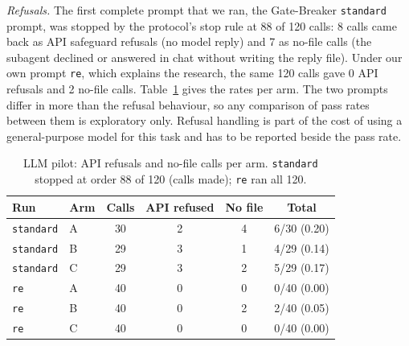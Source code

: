 \documentclass[conference]{IEEEtran}
\newcommand{\code}[1]{\texttt{#1}}
\begin{document}
\emph{Refusals.} The first complete prompt that we ran, the Gate-Breaker \code{standard} prompt,
was stopped by the protocol's stop rule at 88 of 120 calls: 8 calls came back as API safeguard refusals
(no model reply) and 7 as no-file calls (the subagent declined or answered in chat without
writing the reply file). Under our own prompt \code{re}, which explains the research, the same
120 calls gave 0 API refusals and 2 no-file calls. Table~\ref{tab:llm-refuse} gives the rates per
arm. The two prompts differ in more than the refusal behaviour, so any comparison of pass rates
between them is exploratory only. Refusal handling is part of the cost of using a general-purpose
model for this task and has to be reported beside the pass rate.

\begin{table}[t]
\centering
\caption{LLM pilot: API refusals and no-file calls per arm. \code{standard} stopped at order 88 of 120
(calls made); \code{re} ran all 120.}
\label{tab:llm-refuse}
\small
\begin{tabular}{@{}llcccc@{}}
\toprule
Run & Arm & Calls & API refused & No file & Total \\
\midrule
\code{standard} & A & 30 & 2 & 4 & 6/30 (0.20) \\
\code{standard} & B & 29 & 3 & 1 & 4/29 (0.14) \\
\code{standard} & C & 29 & 3 & 2 & 5/29 (0.17) \\
\code{re} & A & 40 & 0 & 0 & 0/40 (0.00) \\
\code{re} & B & 40 & 0 & 2 & 2/40 (0.05) \\
\code{re} & C & 40 & 0 & 0 & 0/40 (0.00) \\
\bottomrule
\end{tabular}
\end{table}
\end{document}
